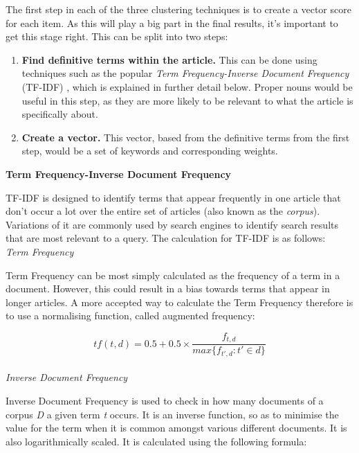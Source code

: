 \documentclass[12pt]{article}
\begin{document}
The first step in each of the three clustering techniques is to create a vector score for each item. As this will play a big part in the final results, it's important to get this stage right. This can be split into two steps: \\

\begin{enumerate}
	\item \textbf{Find definitive terms within the article.} This can be done using techniques such as the popular \emph{Term Frequency-Inverse Document Frequency}  (TF-IDF) , which is explained in further detail below. Proper nouns would be useful in this step, as they are more likely to be relevant to what the article is specifically about. 
	\item \textbf{Create a vector.} This vector, based from the definitive terms from the first step, would be a set of keywords and corresponding weights. \\
\end{enumerate}

\textbf{Term Frequency-Inverse Document Frequency}

TF-IDF \cite{tfidf} is designed to identify terms that appear frequently in one article that don't occur a lot over the entire set of articles (also known as the \emph{corpus}). Variations of it are commonly used by search engines to identify search results that are most relevant to a query. The calculation for TF-IDF is as follows: \\

\emph{Term Frequency}

Term Frequency can be most simply calculated as the frequency of a term in a document. However, this could result in a bias towards terms that appear in longer articles. A more accepted way to calculate the Term Frequency therefore is to use a normalising function, called augmented frequency:

\[tf(t,d) = 0.5 + 0.5 \times \frac{f_{t,d}}{max\{f_{t',d} : t' \in d\}} \] \\

\emph{Inverse Document Frequency}

Inverse Document Frequency is used to check in how many documents of a corpus \emph{D} a given term \emph{t} occurs. It is an inverse function, so as to minimise the value for the term when it is common amongst various different documents. It is also logarithmically scaled. It is calculated using the following formula:
\end{document}
